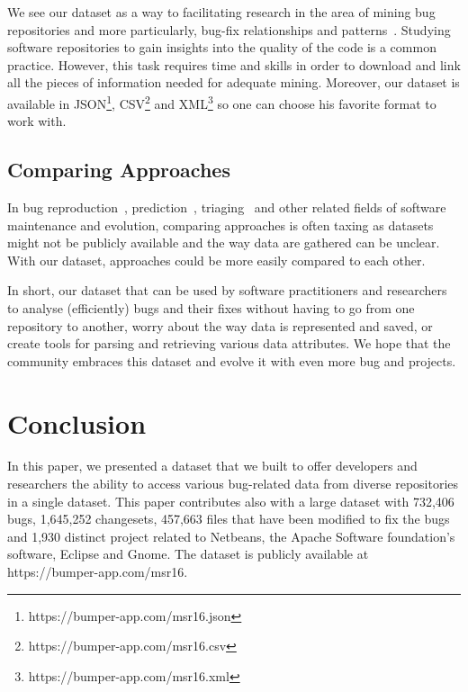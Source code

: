 \documentclass{sig-alternate-05-2015}
\begin{document}
We see our dataset as a way to facilitating research in the area
of mining bug repositories and more particularly, bug-fix relationships and patterns~\cite{Kim2013e,Saha2014,Martinez2014}. Studying software repositories to gain insights
into the quality of the code is a common practice.
However, this task requires
time and skills in order to download and link all the pieces of information
needed for adequate mining. Moreover, our dataset is available in JSON\footnote{https://bumper-app.com/msr16.json}, CSV\footnote{https://bumper-app.com/msr16.csv} and XML\footnote{https://bumper-app.com/msr16.xml} so one can choose his favorite format to work with.

\subsection{Comparing Approaches}
\label{sub:Comparing Approaches}

In bug reproduction~\cite{Chen2013,Jin2013,Nayrolles2015}, prediction~\cite{Kamei2010,Bhattacharya2011}, triaging~\cite{Anvik2006,Jeong2009,Kong2011} and other related fields of software maintenance and evolution, comparing approaches is often taxing as datasets might not be publicly available and the way data are gathered can be unclear.
With our dataset, approaches could be more easily compared to each other.

In short, our dataset that can be used by software practitioners
and researchers to analyse (efficiently) bugs and their fixes without having
to go from one repository to another, worry about the way data is represented
and saved, or create tools for parsing and retrieving various data attributes.
We hope that the community embraces this dataset and evolve it with even more bug and projects.

\section{Conclusion}
\label{sec:Conclusion}

In this paper, we presented a dataset that we built to offer developers and
researchers the ability to access various bug-related data
from diverse repositories in a single dataset. This paper
contributes also with a large dataset with 732,406 bugs,
1,645,252 changesets, 457,663 files that have been modified to fix the bugs
and 1,930 distinct project
related to Netbeans, the Apache Software foundation's
software, Eclipse and Gnome. The dataset is publicly available at https://bumper-app.com/msr16.
\end{document}
